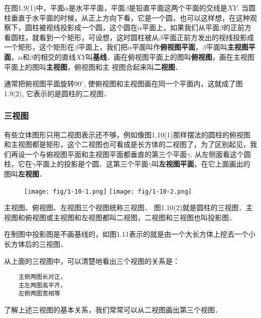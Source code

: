 在图1.9(1)中，平面$\alpha$是水平平面，平面$\beta$是铅直平面这两个平面的交线是$XY$. 当圆柱垂直于水平面的时候，从正上方向下看，它是一个圆，也可以这样想，在这种观察下，圆柱被视线投影成一个圆，这个圆在$\alpha$平面上，如果我们从平面$\beta$的正前方看圆柱，就看到一个矩形，可设想，这时圆柱被从$\beta$平面正前方发出的视线投影成一个矩形，这个矩形在$\beta$平面上，我们把$\alpha$平面叫作\textbf{俯视图平面}，$\beta$平面叫\textbf{主视图平面}，$\alpha$和$\beta$的相交的直线$XY$叫\textbf{基线}．画在俯视图平面上的图叫\textbf{俯视图}，画在主视图平面上的图叫\textbf{主视图}，俯视图和主
视图合起来叫\textbf{二视图}．

通常把俯视图平面旋转$90^{\circ}$, 使俯视图和主视图画在同一个平面内，这就成了图1.9(2), 它表示的是圆柱的二视图．

\subsubsection{三视图}

有些立体图形只用二视图表示还不够，例如像图1.10(1)那样摆法的圆柱的俯视图和主视图都是矩形，这个二视图也可看成是长方体的二视图了，为了区别起见，我们再设一个与俯视图平面和主视图平面都垂直的第三个平面$\gamma$, 从左侧面看这个圆柱，它在$\gamma$平面上的投影是个圆．这第三个平面$\gamma$叫\textbf{左视图平面}，在它上面画出的图叫\textbf{左视图}．

\begin{figure}[htp]
    \centering
\texttt{[image: fig/1-10-1.png]}
    \texttt{[image: fig/1-10-2.png]}
    \caption{}
    \end{figure}


主视图、俯视图、左视图三个视图统称三视图．
图1.10(2)就是圆柱的三视图．主视图和俯视图或主视图和左视图都叫二视图，二视图和三视图也叫投影图．

在制图中投影图是不画基线的，如图1.11表示的就是由一个大长方体上挖去一个小长方体后的三视图．

从上面的三视图中，可以清楚地看出三个视图的关系是：

\begin{verbatim}
    主俯两图长对正，
    主左两图高平齐，
    左俯两图宽相等
\end{verbatim}

了解上述三视图的基本关系，我们常常可以从二视图画出第三个视图．


